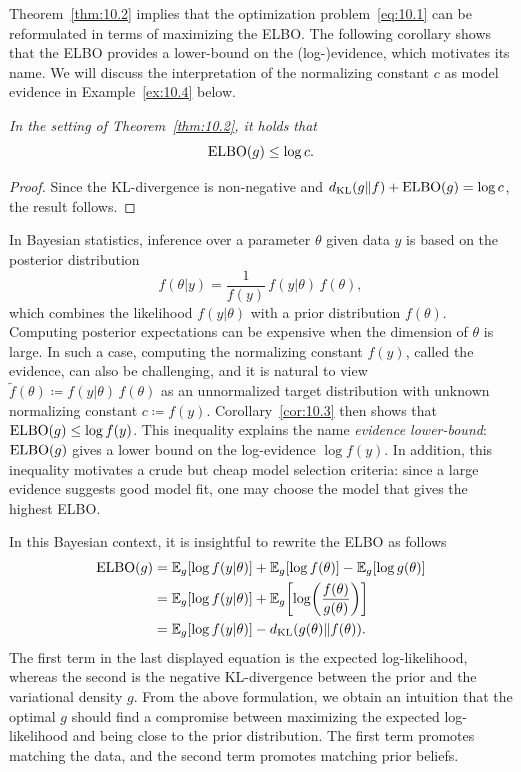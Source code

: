 Theorem~\ref{thm:10.2} implies that the optimization problem~\eqref{eq:10.1} can be reformulated in
terms of maximizing the ELBO\@. The following corollary shows that the ELBO provides a lower-bound on
the (log-)evidence, which motivates its name. We will discuss the interpretation of the normalizing
constant $c$ as model evidence in Example~\ref{ex:10.4} below.

\begin{corollary}
  \label{cor:10.3}
  \textit{In the setting of Theorem~\ref{thm:10.2}, it holds that}
  \[
    \mathrm{ELBO}(g) \leq \log c.
  \]
\end{corollary}

\begin{proof}
Since the KL-divergence is non-negative and $d_{\mathrm{KL}}(g\|f) + \mathrm{ELBO}(g) = \log c$, the result
follows.
\end{proof}

\begin{example}
  \label{ex:10.4}
  In Bayesian statistics, inference over a parameter $\theta$ given data $y$ is based on the
  posterior distribution
  \[
    f(\theta | y) = \frac{1}{f(y)}\, f(y|\theta)\, f(\theta),
  \]
  which combines the likelihood $f(y|\theta)$ with a prior distribution $f(\theta)$. Computing
  posterior expectations can be expensive when the dimension of $\theta$ is large. In such a case,
  computing the normalizing constant $f(y)$, called the evidence, can also be challenging, and it is
  natural to view $\tilde{f}(\theta) \coloneqq f(y|\theta)\,f(\theta)$ as an unnormalized target
  distribution with unknown normalizing constant $c \coloneqq f(y)$. Corollary~\ref{cor:10.3} then
  shows that $\mathrm{ELBO}(g) \leq \log f(y)$. This inequality explains the name \textit{evidence
  lower-bound}: $\mathrm{ELBO}(g)$ gives a lower bound on the log-evidence $\log f(y)$. In addition, this
  inequality motivates a crude but cheap model selection criteria: since a large evidence suggests
  good model fit, one may choose the model that gives the highest ELBO\@.

  In this Bayesian context, it is insightful to rewrite the ELBO as follows
  \begin{align*}
    \mathrm{ELBO}(g)
      &= \mathbb{E}_g[\log f(y|\theta)] + \mathbb{E}_g[\log f(\theta)] - \mathbb{E}_g[\log g(\theta)] \\
      &= \mathbb{E}_g[\log f(y|\theta)] + \mathbb{E}_g\!\left[\log\!\left(\frac{f(\theta)}{g(\theta)}\right)\right] \\
      &= \mathbb{E}_g[\log f(y|\theta)] - d_{\mathrm{KL}}(g(\theta)\|f(\theta)).
  \end{align*}
  The first term in the last displayed equation is the expected log-likelihood, whereas the second is
  the negative KL-divergence between the prior and the variational density $g$. From the above
  formulation, we obtain an intuition that the optimal $g$ should find a compromise between
  maximizing the expected log-likelihood and being close to the prior distribution. The first term
  promotes matching the data, and the second term promotes matching prior beliefs.
\end{example}

